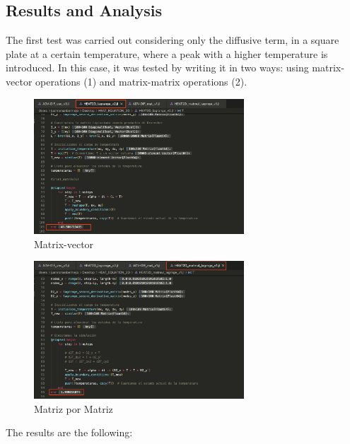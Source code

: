 \clearpage
\subsection{Results and Analysis}
The first test was carried out considering only the diffusive term, in a square plate at a certain temperature, where a peak with a higher temperature is introduced. In this case, it was tested by writing it in two ways: using matrix-vector operations (1) and matrix-matrix operations (2).
\begin{figure}[H]
    \centering
    \includegraphics[width=0.7\textwidth]{Figures/HEAT-VEC-time.png}
    \caption{ Matrix-vector}
    \label{fig:etiqueta_figure}
\end{figure}


\begin{figure}[H]
    \centering
    \includegraphics[width=0.7\textwidth]{Figures/HEAT-MAT-time.png}
    \caption{Matriz por Matriz}
    \label{fig:etiqueta_figure}
\end{figure}


\newpage
The results are the following: 


